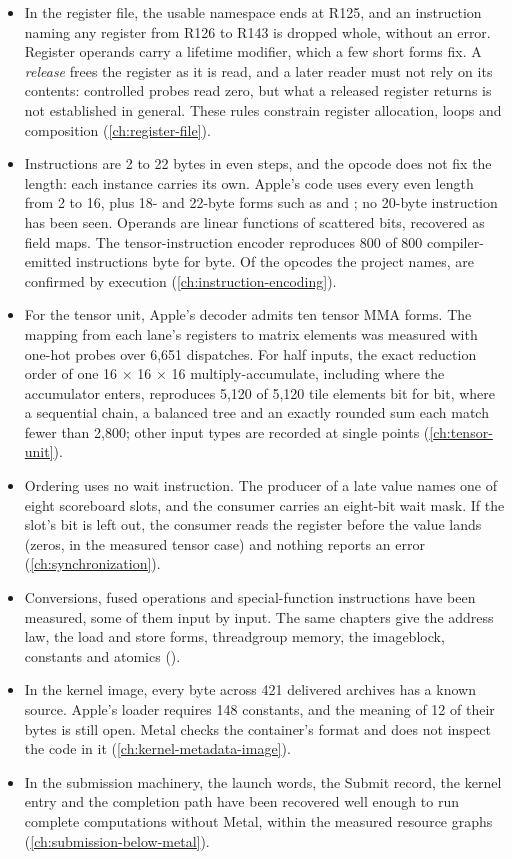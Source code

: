 \begin{itemize}
\item In the register file, the usable namespace ends at R125, and an instruction naming any register from R126 to R143
  is dropped whole, without an error. Register operands carry a lifetime modifier, which a few short forms fix. A \emph{release} frees the register as it is
  read, and a later reader must not rely on its contents: controlled probes read zero, but what a released register
  returns is not established in general. These rules constrain register allocation, loops and composition (\cref{ch:register-file}).
\item Instructions are 2 to 22 bytes in even steps, and the opcode does not fix the length: each instance
  carries its own. Apple's code uses every even length from 2 to 16, plus 18- and 22-byte forms such as  and ; no 20-byte instruction has been seen. Operands are linear functions of
  scattered bits, recovered as field maps. The tensor-instruction encoder reproduces 800 of 800 compiler-emitted
  instructions byte for byte. Of the  opcodes the project names,  are confirmed by execution
  (\cref{ch:instruction-encoding}).
\item For the tensor unit, Apple's decoder admits ten tensor MMA forms. The mapping from each lane's registers to matrix elements
  was measured with one-hot probes over 6,651 dispatches. For half inputs, the exact reduction order of one 16 × 16 × 16
  multiply-accumulate, including where the accumulator enters, reproduces 5,120 of 5,120 tile elements bit for bit,
  where a sequential chain, a balanced tree and an exactly rounded sum each match fewer than 2,800; other input types are
  recorded at single points (\cref{ch:tensor-unit}).
\item Ordering uses no wait instruction. The producer of a late value names one of eight scoreboard slots, and
  the consumer carries an eight-bit wait mask. If the slot's bit is left out, the consumer reads the register before the value lands
  (zeros, in the measured tensor case) and nothing reports an error (\cref{ch:synchronization}).
\item Conversions, fused operations and special-function instructions have been measured, some of them input by
  input. The same chapters give the address law, the load and store forms, threadgroup memory, the imageblock,
  constants and atomics ().
\item In the kernel image, every byte across 421 delivered archives has a known source. Apple's loader requires 148
  constants, and the meaning of 12 of their bytes is still open. Metal checks the container's format and does not inspect the code in it (\cref{ch:kernel-metadata-image}).
\item In the submission machinery, the launch words, the Submit record, the kernel entry and the completion path have
  been recovered well enough to run complete computations without Metal, within the measured resource graphs
  (\cref{ch:submission-below-metal}).
\end{itemize}

